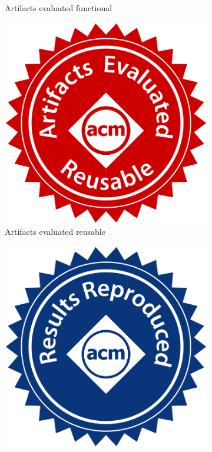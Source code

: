 \documentclass[logo,msc,dsti]{infthesis}    %
\begin{document}
\begin{figure}
\begin{subfigure}[t]{0.3\columnwidth}
         \caption{Artifacts evaluated functional}
         \label{fig:three sin x}
     \end{subfigure}
     \hfill
     \begin{subfigure}[t]{0.3\columnwidth}
         \centering
         \includegraphics[width=\textwidth]{assets/artifacts_evaluated_reusable.jpg}
         \caption{Artifacts evaluated reusable}
         \label{fig:five over x}
     \end{subfigure}
    \par\bigskip
     \begin{subfigure}[t]{0.3\columnwidth}
         \centering
         \includegraphics[width=\textwidth]{assets/results_reproduced.jpg}

\end{subfigure}
\end{figure}
\end{document}
